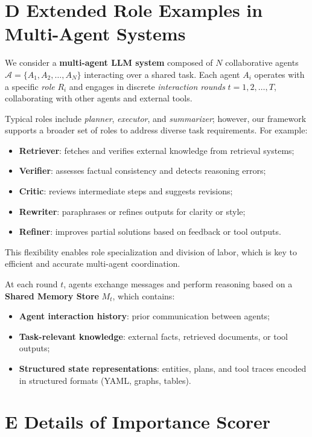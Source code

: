 \section{D \quad  Extended Role Examples in Multi-Agent Systems}  \label{app:broader} 

We consider a \textbf{multi-agent LLM system} composed of $N$ collaborative agents $\mathcal{A} = \{ A_1, A_2, \dots, A_N \}$ interacting over a shared task. Each agent $A_i$ operates with a specific \textit{role} $R_i$ and engages in discrete \textit{interaction rounds} $t = 1, 2, \dots, T$, collaborating with other agents and external tools.

Typical roles include \textit{planner}, \textit{executor}, and \textit{summarizer}; however, our framework supports a broader set of roles to address diverse task requirements. For example:
\begin{itemize}
    \item \textbf{Retriever}: fetches and verifies external knowledge from retrieval systems;
    \item \textbf{Verifier}: assesses factual consistency and detects reasoning errors;
    \item \textbf{Critic}: reviews intermediate steps and suggests revisions;
    \item \textbf{Rewriter}: paraphrases or refines outputs for clarity or style;
    \item \textbf{Refiner}: improves partial solutions based on feedback or tool outputs.
\end{itemize}

This flexibility enables role specialization and division of labor, which is key to efficient and accurate multi-agent coordination.

At each round $t$, agents exchange messages and perform reasoning based on a \textbf{Shared Memory Store} $M_t$, which contains:
\begin{itemize}
    \item \textbf{Agent interaction history}: prior communication between agents;
    \item \textbf{Task-relevant knowledge}: external facts, retrieved documents, or tool outputs;
    \item \textbf{Structured state representations}: entities, plans, and tool traces encoded in structured formats (YAML, graphs, tables).
\end{itemize}

\section{E \quad Details of Importance Scorer}
\label{appendix:importance_scorer}

